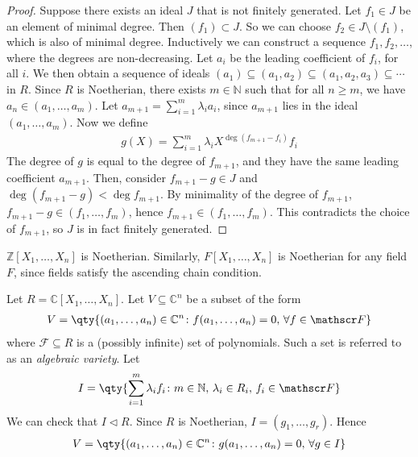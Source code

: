 \begin{proof}
	Suppose there exists an ideal $J$ that is not finitely generated.
	Let $f_1 \in J$ be an element of minimal degree.
	Then $(f_1) \subset J$.
	So we can choose $f_2 \in J \setminus (f_1)$, which is also of minimal degree.
	Inductively we can construct a sequence $f_1, f_2, \dots$, where the degrees are non-decreasing.
	Let $a_i$ be the leading coefficient of $f_i$, for all $i$.
	We then obtain a sequence of ideals $(a_1) \subseteq (a_1, a_2) \subseteq (a_1, a_2, a_3) \subseteq \cdots$ in $R$.
	Since $R$ is Noetherian, there exists $m \in \mathbb N$ such that for all $n \geq m$, we have $a_{n} \in (a_1, \dots, a_m)$.
	Let $a_{m+1} = \sum_{i=1}^m \lambda_i a_i$, since $a_{m+1}$ lies in the ideal $(a_1, \dots, a_m)$.
	Now we define
	\begin{align*}
		g(X) = \sum_{i=1}^m \lambda_i X^{\deg (f_{m+1} - f_i)} f_i
	\end{align*}
	The degree of $g$ is equal to the degree of $f_{m+1}$, and they have the same leading coefficient $a_{m+1}$.
	Then, consider $f_{m+1} - g \in J$ and $\deg (f_{m+1} - g) < \deg f_{m+1}$.
	By minimality of the degree of $f_{m+1}$, $f_{m+1} - g \in (f_1, \dots, f_m)$, hence $f_{m+1} \in (f_1, \dots, f_m)$.
	This contradicts the choice of $f_{m+1}$, so $J$ is in fact finitely generated.
\end{proof}
\begin{corollary}
	$\mathbb Z[X_1, \dots, X_n]$ is Noetherian.
	Similarly, $F[X_1, \dots, X_n]$ is Noetherian for any field $F$, since fields satisfy the ascending chain condition.
\end{corollary}
\begin{example}
	Let $R = \mathbb C[X_1, \dots, X_n]$.
	Let $V \subseteq \mathbb C^n$ be a subset of the form
	\begin{align*}
		V = \qty{(a_1, \dots, a_n) \in \mathbb C^n \colon f(a_1, \dots, a_n) = 0,\,\forall f \in \mathscr F}
	\end{align*}
	where $\mathscr F \subseteq R$ is a (possibly infinite) set of polynomials.
	Such a set is referred to as an \textit{algebraic variety}.
	Let
	\begin{align*}
		I = \qty{\sum_{i=1}^m \lambda_i f_i \colon m \in \mathbb N,\, \lambda_i \in R_i,\, f_i \in \mathscr F}
	\end{align*}
	We can check that $I \triangleleft R$.
	Since $R$ is Noetherian, $I = (g_1, \dots, g_r)$.
	Hence
	\begin{align*}
		V = \qty{(a_1, \dots, a_n) \in \mathbb C^n \colon g(a_1, \dots, a_n) = 0,\,\forall g \in I}
	\end{align*}
\end{example}
